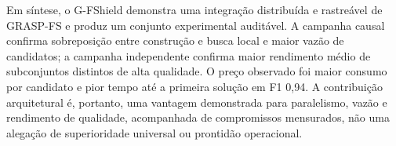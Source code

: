 Em síntese, o G-FShield demonstra uma integração distribuída e rastreável de GRASP-FS e produz um conjunto experimental auditável. A campanha causal confirma sobreposição entre construção e busca local e maior vazão de candidatos; a campanha independente confirma maior rendimento médio de subconjuntos distintos de alta qualidade. O preço observado foi maior consumo por candidato e pior tempo até a primeira solução em F1 0,94. A contribuição arquitetural é, portanto, uma vantagem demonstrada para paralelismo, vazão e rendimento de qualidade, acompanhada de compromissos mensurados, não uma alegação de superioridade universal ou prontidão operacional.
